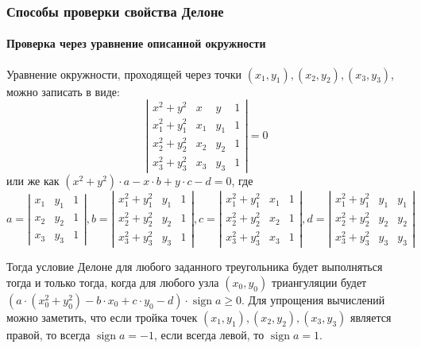 \documentclass{fefu}
\DeclareMathOperator{\sign}{sign}
\begin{document}
\subsubsection{Способы проверки свойства Делоне}
\paragraph{Проверка через уравнение описанной окружности}
Уравнение окружности, проходящей через точки $(x_1, y_1), (x_2, y_2), (x_3, y_3)$, можно записать в виде:
\[
    \left|\begin{matrix}
        x^2 + y^2 & x & y & 1\\
        x^2_1 + y^2_1 & x_1 & y_1 & 1\\
        x^2_2 + y^2_2 & x_2 & y_2 & 1\\
        x^2_3 + y^2_3 & x_3 & y_3 & 1
    \end{matrix}\right| = 0
\]
или же как $(x^2 + y^2)\cdot a - x \cdot b + y \cdot c - d = 0$, где
\[
    a = \left|\begin{matrix}
        x_1 & y_1 & 1\\
        x_2 & y_2 & 1\\
        x_3 & y_3 & 1
    \end{matrix}\right|,
    b = \left|\begin{matrix}
        x^2_1 + y^2_1 & y_1 & 1\\
        x^2_2 + y^2_2 & y_2 & 1\\
        x^2_3 + y^2_3 & y_3 & 1
    \end{matrix}\right|,
    c = \left|\begin{matrix}
        x^2_1 + y^2_1 & x_1 & 1\\
        x^2_2 + y^2_2 & x_2 & 1\\
        x^2_3 + y^2_3 & x_3 & 1
    \end{matrix}\right|,
    d = \left|\begin{matrix}
        x^2_1 + y^2_1 & y_1 & y_1\\
        x^2_2 + y^2_2 & y_2 & y_2\\
        x^2_3 + y^2_3 & y_3 & y_3
    \end{matrix}\right|
\]

Тогда условие Делоне для любого заданного треугольника будет
выполняться тогда и только тогда, когда для любого узла $(x_0, y_0)$ триангуляции будет $\left(a \cdot (x^2_0 + y^2_0) -
b\cdot x_0 + c \cdot y_0 - d\right)\cdot \sign a \geq 0$. Для упрощения вычислений можно заметить, что если тройка
точек $(x_1, y_1), (x_2, y_2), (x_3, y_3)$ является правой, то всегда $\sign a = -1$, если всегда левой, то $\sign a = 1$.
\end{document}
